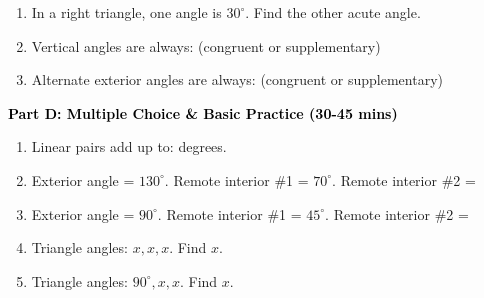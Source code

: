 \documentclass[12pt, letterpaper, fleqn]{article}
\newcommand{\blank}{\underline{\hspace{2.2cm}}}
\begin{document}
\vspace{3mm}

\begin{enumerate}[itemsep=2.5cm, leftmargin=0.6cm, resume]
\item In a right triangle, one angle is $30^\circ$. Find the other acute angle. \blank
\item Vertical angles are always: \blank (congruent or supplementary)
\item Alternate exterior angles are always: \blank (congruent or supplementary)
\end{enumerate}

\newpage

\begin{tcolorbox}[colback=customteal!20]
\large\textcolor{black}{\textbf{Part D: Multiple Choice \& Basic Practice (30-45 mins)}}
\end{tcolorbox}

\vspace{3mm}

\begin{enumerate}[itemsep=2.5cm, leftmargin=0.6cm, resume]
\item Linear pairs add up to: \blank degrees.
\item Exterior angle = $130^\circ$. Remote interior \#1 = $70^\circ$. Remote interior \#2 = \blank
\item Exterior angle = $90^\circ$. Remote interior \#1 = $45^\circ$. Remote interior \#2 = \blank
\item Triangle angles: $x, x, x$. Find $x$. \blank
\item Triangle angles: $90^\circ, x, x$. Find $x$. \blank
\end{enumerate}
\end{document}
